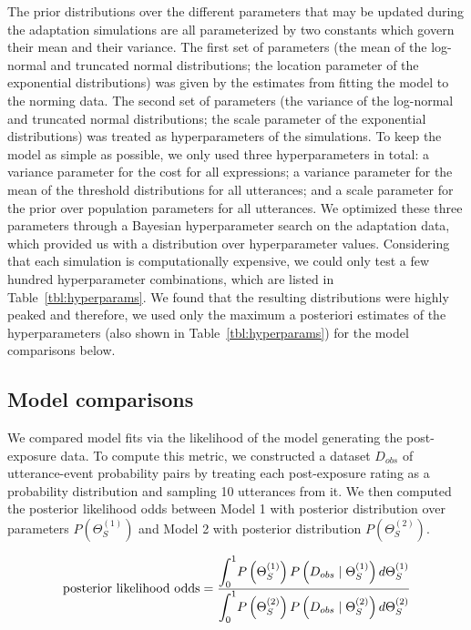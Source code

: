 \documentclass[man, floatsintext]{apa6}
\begin{document}
The prior distributions over the different parameters that may be updated during the adaptation simulations are all parameterized by two constants which govern their mean and their variance. The first set of parameters (the mean of the log-normal and truncated normal distributions; the location parameter of the exponential distributions) was given by the estimates from fitting the model to the norming data. The second set of parameters (the variance of the log-normal and truncated normal distributions; the scale parameter of the exponential distributions) was treated as hyperparameters of the simulations. To keep the model as simple as possible, we only used three hyperparameters in total: a variance parameter for the cost for all expressions; a variance parameter for the mean of the threshold distributions for all utterances; and a scale parameter for the prior over population parameters for all utterances. We optimized these three parameters through a Bayesian hyperparameter search on the adaptation data, which provided us with a distribution over hyperparameter values. Considering that each simulation is computationally expensive, we could only test a few hundred hyperparameter combinations, which are listed in Table~\ref{tbl:hyperparams}. We found that the resulting distributions were highly peaked and therefore, we used only the maximum a posteriori estimates of the hyperparameters (also shown in Table~\ref{tbl:hyperparams}) for the model comparisons below.


\subsection{Model comparisons}

We compared model fits via the likelihood of the model generating the post-exposure data. To compute this metric, we constructed a dataset $D_{obs}$ of utterance-event probability pairs by treating each post-exposure rating as a probability distribution and sampling 10 utterances from it. We then computed the posterior likelihood odds between Model 1 with posterior distribution over parameters $P(\Theta_{S}^{(1)})$ and Model 2 with posterior distribution $P(\Theta_{S}^{(2)})$.

$$\mbox{posterior likelihood odds} = \frac{\mathlarger{\int_{0}^{1}} {P\left(\Theta_{S}^{(1)}\right) P\left(D_{obs} \mid \Theta_{S}^{(1)} \right) d   \Theta_{S}^{(1)}}}{\mathlarger{\int_0^1} P\left(\Theta_{S}^{(2)}\right) P\left(D_{obs} \mid \Theta_{S}^{(2)}\right)d   \Theta_{S}^{(2)} }$$
 
\end{document}
